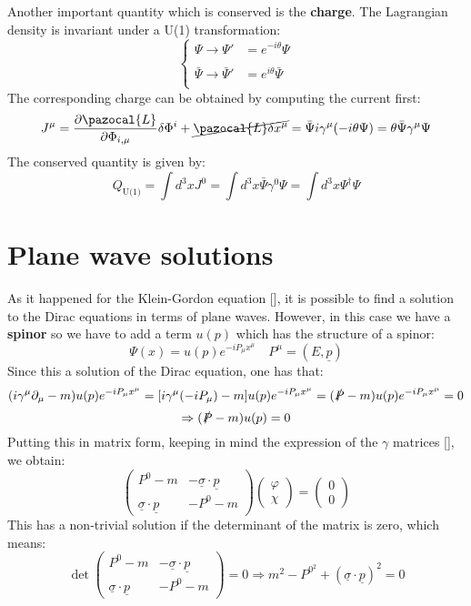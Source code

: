 \documentclass[../main.tex]{subfiles}
\begin{document}
Another important quantity which is conserved is the \textbf{charge}. The Lagrangian density is invariant under a U(1) transformation:
\[
\left\{
\begin{aligned}
\Psi\xrightarrow[]{}\Psi'&=e^{-i\theta}\Psi\\
\bar{\Psi}\xrightarrow[]{}\bar{\Psi}'&=e^{i\theta}\bar{\Psi}
\end{aligned}
\right.
\]
The corresponding charge can be obtained by computing the current first:
\[
J^\mu=\frac{\partial\pazocal{L}}{\partial\Phi_{i,\mu}}\delta\Phi^i+\cancel{\pazocal{L}\delta x^\mu}=\bar{\Psi}i\gamma^\mu(-i\theta\Psi)=\theta\bar{\Psi}\gamma^\mu\Psi
\]
The conserved quantity is given by:
\[
Q_{\text{U(1)}}=\int d^3x J^0=\int d^3x\bar{\Psi}\gamma^0\Psi=\int d^3x\Psi^\dagger\Psi
\]
\section{Plane wave solutions}
As it happened for the Klein-Gordon equation [], it is possible to find a solution to the Dirac equations in terms of plane waves. However, in this case we have a \textbf{spinor} so we have to add a term $u(p)$ which has the structure of a spinor:
\[
\Psi(x)=u(p)e^{-iP_\mu x^\mu} \quad P^\mu=(E,\underline{p})
\]
Since this a solution of the Dirac equation, one has that:
\[
(i\gamma^\mu\partial_\mu-m)u(p)e^{-iP_\mu x^\mu}=[i\gamma^\mu(-iP_\mu)-m]u(p)e^{-iP_\mu x^\mu}=(\slashed{P}-m)u(p)e^{-iP_\mu x^\mu}=0
\]
\[
\Rightarrow(\slashed{P}-m)u(p)=0
\]
Putting this in  matrix form, keeping in mind the expression of the $\gamma$ matrices [], we obtain:
\[
\left(\begin{array}{cc}
    P^0-m & -\underline{\sigma}\cdot\underline{p} \\
    \underline{\sigma}\cdot\underline{p} & -P^0-m
\end{array}\right)\left(\begin{array}{c}
    \varphi\\
    \chi
\end{array}\right)=\left(\begin{array}{c}
    0\\
    0
\end{array}\right)
\]
This has a non-trivial solution if the determinant of the matrix is zero, which means:
\[
\det\left(\begin{array}{cc}
    P^0-m & -\underline{\sigma}\cdot\underline{p} \\
    \underline{\sigma}\cdot\underline{p} & -P^0-m
\end{array}\right)=0\Rightarrow m^2-P^{0^2}+(\underline{\sigma}\cdot\underline{p})^2=0
\]
\end{document}
